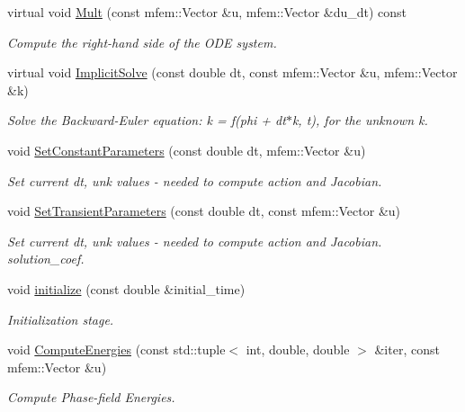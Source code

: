 \begin{DoxyCompactItemize}
virtual void \hyperlink{classPhaseFieldOperatorBase_a55a314426a0d9bbb181cb5d35e8f76e9}{Mult} (const mfem\+::\+Vector \&u, mfem\+::\+Vector \&du\+\_\+dt) const
\begin{DoxyCompactList}\small\item\em Compute the right-\/hand side of the O\+DE system. \end{DoxyCompactList}\item 
virtual void \hyperlink{classPhaseFieldOperatorBase_ac1be84d201e35ba329090cdda6a4bfc5}{Implicit\+Solve} (const double dt, const mfem\+::\+Vector \&u, mfem\+::\+Vector \&k)
\begin{DoxyCompactList}\small\item\em Solve the Backward-\/\+Euler equation\+: k = f(phi + dt$\ast$k, t), for the unknown k. \end{DoxyCompactList}\item 
void \hyperlink{classPhaseFieldOperatorBase_ae28add1cf3731d10726a9665862a725b}{Set\+Constant\+Parameters} (const double dt, mfem\+::\+Vector \&u)
\begin{DoxyCompactList}\small\item\em Set current dt, unk values -\/ needed to compute action and Jacobian. \end{DoxyCompactList}\item 
void \hyperlink{classPhaseFieldOperatorBase_a07fb8bcd8791bb712681379c160c1ad6}{Set\+Transient\+Parameters} (const double dt, const mfem\+::\+Vector \&u)
\begin{DoxyCompactList}\small\item\em Set current dt, unk values -\/ needed to compute action and Jacobian. solution\+\_\+coef. \end{DoxyCompactList}\item 
void \hyperlink{classPhaseFieldOperatorBase_a4a85f7d2ece328d8fdb8895a2b76bd0a}{initialize} (const double \&initial\+\_\+time)
\begin{DoxyCompactList}\small\item\em Initialization stage. \end{DoxyCompactList}\item 
void \hyperlink{classPhaseFieldOperatorBase_ac313363a74691d6b500191ff475b57fb}{Compute\+Energies} (const std\+::tuple$<$ int, double, double $>$ \&iter, const mfem\+::\+Vector \&u)
\begin{DoxyCompactList}\small\item\em Compute Phase-\/field Energies. \end{DoxyCompactList}\item 

\end{DoxyCompactItemize}
